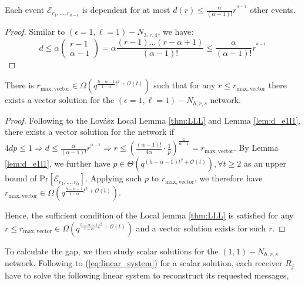 \begin{lem}
Each event $\mathcal{E}_{r_{1},\ldots,r_{h-\epsilon}}$ is dependent
for at most $d\left(r\right)\leq\frac{\alpha}{\left(\alpha-1\right)!}r^{^{\alpha-1}}$
other events. \label{lem:d_e1l1}
\end{lem}
\begin{proof}
Similar to $\left(\epsilon=1,\ell=1\right)-\ensuremath{N}_{3,r,4}$,
we have:
\[
d\leq\alpha\left(\begin{array}{c}
r-1\\
\alpha-1
\end{array}\right)=\alpha\frac{\left(r-1\right)\ldots\left(r-\alpha+1\right)}{\left(\alpha-1\right)!}\leq\frac{\alpha}{\left(\alpha-1\right)!}r^{^{\alpha-1}}
\]
\end{proof}
\begin{thm}
There is $r_{\mathrm{max,vector}}\in\Omega\left(q^{\frac{h-\alpha-1}{1-\alpha}t^{2}+\mathcal{O}(t)}\right)$
such that for any $r\leq r_{\mathrm{max,vector}}$ there exists a
vector solution for the $\left(\epsilon=1,\ell=1\right)-\ensuremath{N}_{h,r,s}$
network. \label{theo:r_vector_e1l1}
\end{thm}
\begin{proof}
Following to the Lov\'asz Local Lemma \ref{thm:LLL} and Lemma \ref{lem:d_e1l1},
there exists a vector solution for the network if $4dp\leq1\Rightarrow d\leq\frac{\alpha}{\left(\alpha-1\right)!}r^{^{\alpha-1}}\Rightarrow r\leq\left(\frac{\left(\alpha-1\right)!}{4\alpha}\cdot\frac{1}{p}\right)^{\frac{1}{\alpha-1}}=r_{\mathrm{max,vector}}$.
By Lemma \ref{lem:d_e1l1}, we further have $p\in\Theta\left(q^{\left(h-\alpha-1\right)t^{2}+\mathcal{O}(t)}\right),\forall t\geq2$
as an upper bound of $\mathrm{Pr}\left[\mathcal{E}_{r_{1},\ldots,r_{\alpha}}\right]$.
Applying such $p$ to $r_{\mathrm{max,vector}}$, we therefore have
$r_{\mathrm{max,vector}}\in\Omega\left(q^{\frac{h-\alpha-1}{1-\alpha}t^{2}+\mathcal{O}(t)}\right)$.

Hence, the sufficient condition of the Local lemma \ref{thm:LLL}
is satisfied for any $r\leq r_{\mathrm{max,vector}}\in\Omega\left(q^{\frac{h-\alpha-1}{1-\alpha}t^{2}+\mathcal{O}(t)}\right)$
and a vector solution exists for such $r$.
\end{proof}
To calculate the gap, we then study scalar solutions for the $\left(1,1\right)-\ensuremath{N}_{h,r,s}$
network. Following to (\ref{eq:linear_system}) for a scalar solution,
each receiver $R_{j}$ have to solve the following linear system to
reconstruct its requested messages,

